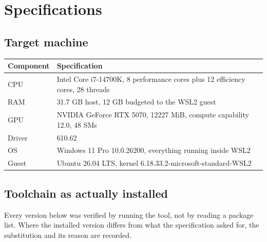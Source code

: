 \documentclass[11pt,a4paper]{report}
\begin{document}
\chapter{Specifications}

\section{Target machine}

\begin{center}
\begin{tabular}{ll}
\toprule
Component & Specification \\
\midrule
CPU & Intel Core i7-14700K, 8 performance cores plus 12 efficiency cores, 28 threads \\
RAM & 31.7 GB host, 12 GB budgeted to the WSL2 guest \\
GPU & NVIDIA GeForce RTX 5070, 12227 MiB, compute capability 12.0, 48 SMs \\
Driver & 610.62 \\
OS & Windows 11 Pro 10.0.26200, everything running inside WSL2 \\
Guest & Ubuntu 26.04 LTS, kernel 6.18.33.2-microsoft-standard-WSL2 \\
\bottomrule
\end{tabular}
\end{center}

\section{Toolchain as actually installed}

Every version below was verified by running the tool, not by reading a package
list. Where the installed version differs from what the specification asked for,
the substitution and its reason are recorded.
\end{document}
